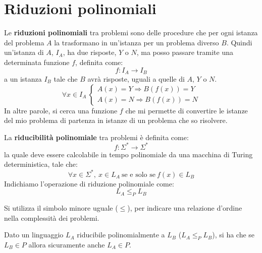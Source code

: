 \section{Riduzioni polinomiali}
Le \textbf{riduzioni polinomiali} tra problemi sono delle procedure che per ogni
istanza del problema $A$ la trasformano in un'istanza per un problema diverso $B$.
Quindi un'istanza di $A$, $I_A$, ha due risposte, $Y$ o $N$, ma posso passare
tramite una determinata funzione $f$, definita come:
\begin{equation}
    f: I_A \to I_B
\end{equation}
a un istanza $I_B$ tale che $B$ avrà risposte, uguali a quelle di $A$, $Y$ o $N$.
\begin{equation}
    \forall x \in I_A \ \begin{cases}
        A(x) = Y \Rightarrow B(f(x)) = Y \\
        A(x) = N \Rightarrow B(f(x)) = N
    \end{cases}
\end{equation}
In altre parole, si cerca una funzione $f$ che mi permette di convertire le
istanze del mio problema di partenza in istanze di un problema che so risolvere.
\begin{definizione}
    La \textbf{riducibilità polinomiale} tra problemi è definita come:
    \begin{equation}
        f: \Sigma^{\ast} \to \Sigma^{\ast}
    \end{equation}
    la quale deve essere calcolabile in tempo polinomiale da una macchina di
    Turing deterministica, tale che:
    \begin{equation}
        \forall x \in \Sigma^{\ast}, \ x \in L_A \ \text{se e solo se} \
        f(x) \in L_B
    \end{equation}
    Indichiamo l'operazione di riduzione polinomiale come:
    \begin{equation}
        L_A \leq_P L_B
    \end{equation}
\end{definizione}
\begin{osservazione}
    Si utilizza il simbolo minore uguale ($\leq$), per indicare una relazione
    d'ordine nella complessità dei problemi.
\end{osservazione}
\begin{teorema}
    Dato un linguaggio $L_A$ riducibile polinomialmente a $L_B$ ($L_A \leq_P L_B$),
    si ha che se $L_B \in P$ allora sicuramente anche $L_A \in P$.
\end{teorema}
